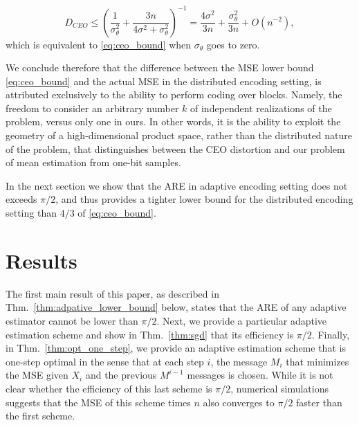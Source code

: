 \documentclass[letterpaper, conference,9pt]{IEEEtran}      %
\begin{document}
\[
D_{CEO} \leq  \left( \frac{1}{\sigma_\theta^2} +  \frac{3n}{4\sigma^2 + \sigma_\theta^2} \right)^{-1}   =
\frac{4 \sigma^2}{3n} +  \frac{\sigma_\theta^2}{3n} + O(n^{-2}),
\]
which is equivalent to \eqref{eq:ceo_bound} when $\sigma_\theta$ goes to zero. \par
We conclude therefore that the difference between the MSE lower bound \eqref{eq:ceo_bound} and the actual MSE in the distributed encoding setting, is attributed exclusively to the ability to perform coding over blocks. Namely, the freedom to consider an arbitrary number $k$ of independent realizations of the problem, versus only one in ours. In other words, it is the ability to exploit the geometry of a high-dimensional product space, rather than the distributed nature of the problem, that distinguishes between the CEO distortion and our problem of mean estimation from one-bit samples.\par
In the next section we show that the ARE in adaptive encoding setting does not exceeds $\pi/2$, and thus provides a tighter lower bound for the distributed encoding setting than $4/3$ of  \eqref{eq:ceo_bound}. 

\section{Results \label{sec:sequential}}
The first main result of this paper, as described in Thm.~\ref{thm:adpative_lower_bound} below, states that the ARE of any adaptive estimator cannot be lower than $\pi/2$. Next, we provide a particular adaptive estimation scheme and show in Thm.~\ref{thm:sgd} that its efficiency is $\pi/2$. Finally, in Thm.~\ref{thm:opt_one_step}, we provide an adaptive estimation scheme that is one-step optimal in the sense that at each step $i$, the message $M_i$ that minimizes the MSE given $X_i$ and the previous $M^{i-1}$ messages is chosen. While it is not clear whether the efficiency of this last scheme is $\pi/2$, numerical simulations suggests that the MSE of this scheme times $n$ also converges to $\pi/2$ faster than the first scheme.

%  
%
%
%
%  
\end{document}
